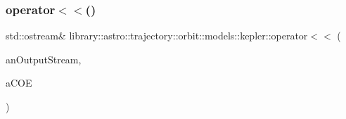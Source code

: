 \subsubsection{\texorpdfstring{operator$<$$<$()}{operator<<()}}
{\footnotesize\ttfamily std\+::ostream\& library\+::astro\+::trajectory\+::orbit\+::models\+::kepler\+::operator$<$$<$ (\begin{DoxyParamCaption}\item[{std\+::ostream \&}]{an\+Output\+Stream,  }\item[{const \hyperlink{classlibrary_1_1astro_1_1trajectory_1_1orbit_1_1models_1_1kepler_1_1_c_o_e}{C\+OE} \&}]{a\+C\+OE }\end{DoxyParamCaption})}

